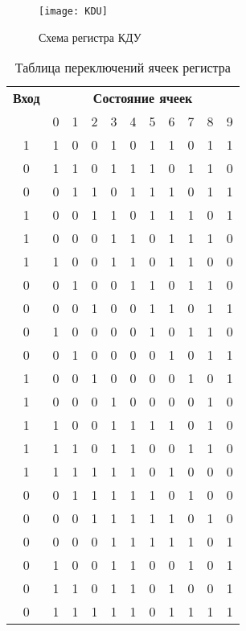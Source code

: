 
\begin{figure}[h!]
  \centering
  \texttt{[image: KDU]}
  \caption{Схема регистра КДУ}
  \label{fig:kdu}
\end{figure}

\begin{table}[h!]
  \caption{Таблица переключений ячеек регистра}
  \begin{tabular}[h!]{|c||p{0.9cm}||p{0.9cm}||p{0.9cm}||p{0.9cm}||p{0.9cm}||p{0.9cm}||p{0.9cm}||p{0.9cm}||p{0.9cm}||p{0.9cm}|}
    \hline
    {\bf Вход} & \multicolumn{10}{c|}{{\bf Состояние ячеек}}\\\cline{2-11}
      & 0 & 1 & 2 & 3 & 4 & 5 & 6 & 7 & 8 & 9 \\ \hline \hline
    1 & 1 & 0 & 0 & 1 & 0 & 1 & 1 & 0 & 1 & 1  \\ \hline
    0 & 1 & 1 & 0 & 1 & 1 & 1 & 0 & 1 & 1 & 0  \\ \hline
    0 & 0 & 1 & 1 & 0 & 1 & 1 & 1 & 0 & 1 & 1  \\ \hline
    1 & 0 & 0 & 1 & 1 & 0 & 1 & 1 & 1 & 0 & 1  \\ \hline
    1 & 0 & 0 & 0 & 1 & 1 & 0 & 1 & 1 & 1 & 0  \\ \hline
    1 & 1 & 0 & 0 & 1 & 1 & 0 & 1 & 1 & 0 & 0  \\ \hline
    0 & 0 & 1 & 0 & 0 & 1 & 1 & 0 & 1 & 1 & 0  \\ \hline
    0 & 0 & 0 & 1 & 0 & 0 & 1 & 1 & 0 & 1 & 1  \\ \hline
    0 & 1 & 0 & 0 & 0 & 0 & 1 & 0 & 1 & 1 & 0  \\ \hline
    0 & 0 & 1 & 0 & 0 & 0 & 0 & 1 & 0 & 1 & 1  \\ \hline
    1 & 0 & 0 & 1 & 0 & 0 & 0 & 0 & 1 & 0 & 1  \\ \hline
    1 & 0 & 0 & 0 & 1 & 0 & 0 & 0 & 0 & 1 & 0  \\ \hline
    1 & 1 & 0 & 0 & 1 & 1 & 1 & 1 & 0 & 1 & 0  \\ \hline
    1 & 1 & 1 & 0 & 1 & 1 & 0 & 0 & 1 & 1 & 0  \\ \hline
    1 & 1 & 1 & 1 & 1 & 1 & 0 & 1 & 0 & 0 & 0  \\ \hline
    0 & 0 & 1 & 1 & 1 & 1 & 1 & 0 & 1 & 0 & 0  \\ \hline
    0 & 0 & 0 & 1 & 1 & 1 & 1 & 1 & 0 & 1 & 0  \\ \hline
    0 & 0 & 0 & 0 & 1 & 1 & 1 & 1 & 1 & 0 & 1  \\ \hline
    0 & 1 & 0 & 0 & 1 & 1 & 0 & 0 & 1 & 0 & 1  \\ \hline
    0 & 1 & 1 & 0 & 1 & 1 & 0 & 1 & 0 & 0 & 1  \\ \hline
    0 & 1 & 1 & 1 & 1 & 1 & 0 & 1 & 1 & 1 & 1 \\ \hline
  \end{tabular}
  \label{tab:reg}
\end{table}

